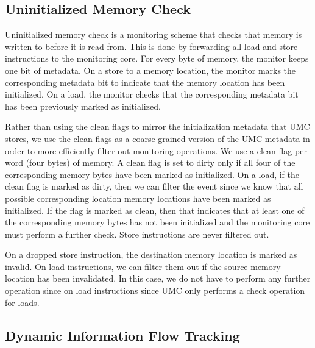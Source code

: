 \subsection{Uninitialized Memory Check}

Uninitialized memory check is a monitoring scheme that checks that memory is
written to before it is read from. This is done by forwarding all load and
store instructions to the monitoring core. For every byte of memory, the
monitor keeps one bit of metadata. On a store to a memory location, the monitor
marks the corresponding metadata bit to indicate that the memory location has
been initialized. On a load, the monitor checks that the corresponding metadata
bit has been previously marked as initialized.

Rather than using the clean flags to mirror the initialization metadata that
UMC stores, we use the clean flags as a coarse-grained version of the UMC
metadata in order to more efficiently filter out monitoring operations. We use
a clean flag per word (four bytes) of memory. A clean flag is set to dirty only
if all four of the corresponding memory bytes have been marked as initialized.
On a load, if the clean flag is marked as dirty, then we can filter the event
since we know that all possible corresponding location memory locations have
been marked as initialized. If the flag is marked as clean, then that indicates
that at least one of the corresponding memory bytes has not been initialized
and the monitoring core must perform a further check. Store instructions are
never filtered out.

On a dropped store instruction, the destination memory location is marked as
invalid. On load instructions, we can filter them out if the source memory
location has been invalidated. In this case, we do not have to perform any
further operation since on load instructions since UMC only performs a check
operation for loads.

\subsection{Dynamic Information Flow Tracking}


